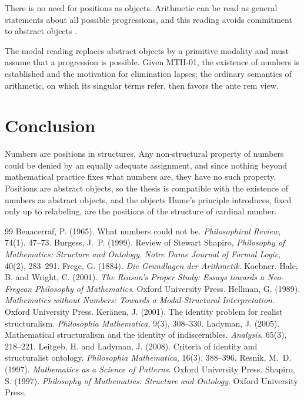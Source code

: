 \documentclass{situationist-preprint}
\begin{document}
\begin{objection}[Eliminativism]
There is no need for positions as objects. Arithmetic can be read as general statements about all possible progressions, and this reading avoids commitment to abstract objects \citep{Hellman1989}.
\end{objection}

\begin{reply}
The modal reading replaces abstract objects by a primitive modality and must assume that a progression is possible. Given MTH-01, the existence of numbers is established and the motivation for elimination lapses; the ordinary semantics of arithmetic, on which its singular terms refer, then favors the ante rem view.
\end{reply}

\section{Conclusion}

Numbers are positions in structures. Any non-structural property of numbers could be denied by an equally adequate assignment, and since nothing beyond mathematical practice fixes what numbers are, they have no such property. Positions are abstract objects, so the thesis is compatible with the existence of numbers as abstract objects, and the objects Hume's principle introduces, fixed only up to relabeling, are the positions of the structure of cardinal number.

\begin{thebibliography}{99}\small
{} Benacerraf, P. (1965). What numbers could not be. \emph{Philosophical Review}, 74(1), 47--73.
 Burgess, J.~P. (1999). Review of Stewart Shapiro, \emph{Philosophy of Mathematics: Structure and Ontology}. \emph{Notre Dame Journal of Formal Logic}, 40(2), 283--291.
 Frege, G. (1884). \emph{Die Grundlagen der Arithmetik}. Koebner.
 Hale, B. and Wright, C. (2001). \emph{The Reason's Proper Study: Essays towards a Neo-Fregean Philosophy of Mathematics}. Oxford University Press.
 Hellman, G. (1989). \emph{Mathematics without Numbers: Towards a Modal-Structural Interpretation}. Oxford University Press.
 Ker\"anen, J. (2001). The identity problem for realist structuralism. \emph{Philosophia Mathematica}, 9(3), 308--330.
 Ladyman, J. (2005). Mathematical structuralism and the identity of indiscernibles. \emph{Analysis}, 65(3), 218--221.
 Leitgeb, H. and Ladyman, J. (2008). Criteria of identity and structuralist ontology. \emph{Philosophia Mathematica}, 16(3), 388--396.
 Resnik, M.~D. (1997). \emph{Mathematics as a Science of Patterns}. Oxford University Press.
 Shapiro, S. (1997). \emph{Philosophy of Mathematics: Structure and Ontology}. Oxford University Press.
\end{thebibliography}
\end{document}

